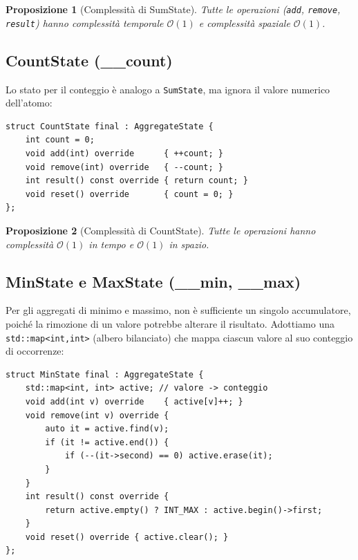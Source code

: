 \documentclass[a4paper,12pt,twoside,openright]{report}
\newtheorem{proposition}{Proposizione}[chapter]
\begin{document}
\begin{proposition}[Complessit\`{a} di SumState]
Tutte le operazioni (\texttt{add}, \texttt{remove}, \texttt{result}) hanno complessit\`{a} temporale $\mathcal{O}(1)$ e complessit\`{a} spaziale $\mathcal{O}(1)$.
\end{proposition}

\subsection{CountState (\_\_count)}

Lo stato per il conteggio \`{e} analogo a \texttt{SumState}, ma ignora il valore numerico dell'atomo:

\begin{lstlisting}[style=cppstyle,caption={Implementazione di \texttt{CountState}}]
struct CountState final : AggregateState {
    int count = 0;
    void add(int) override      { ++count; }
    void remove(int) override   { --count; }
    int result() const override { return count; }
    void reset() override       { count = 0; }
};
\end{lstlisting}

\begin{proposition}[Complessit\`{a} di CountState]
Tutte le operazioni hanno complessit\`{a} $\mathcal{O}(1)$ in tempo e $\mathcal{O}(1)$ in spazio.
\end{proposition}

\subsection{MinState e MaxState (\_\_min, \_\_max)}

Per gli aggregati di minimo e massimo, non \`{e} sufficiente un singolo accumulatore, poich\'{e} la rimozione di un valore potrebbe alterare il risultato. Adottiamo una \texttt{std::map<int,int>} (albero bilanciato) che mappa ciascun valore al suo conteggio di occorrenze:

\begin{lstlisting}[style=cppstyle,caption={Implementazione di \texttt{MinState}}]
struct MinState final : AggregateState {
    std::map<int, int> active; // valore -> conteggio
    void add(int v) override    { active[v]++; }
    void remove(int v) override {
        auto it = active.find(v);
        if (it != active.end()) {
            if (--(it->second) == 0) active.erase(it);
        }
    }
    int result() const override {
        return active.empty() ? INT_MAX : active.begin()->first;
    }
    void reset() override { active.clear(); }
};
\end{lstlisting}
\end{document}
